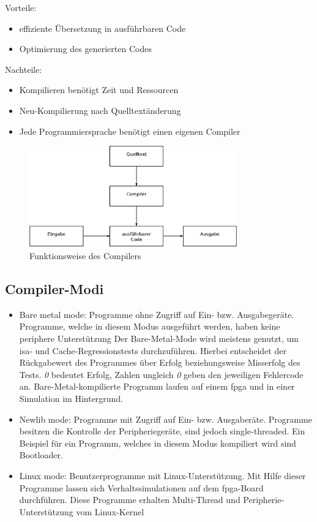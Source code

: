 Vorteile:
\begin{itemize}
  \item effiziente Übersetzung in ausführbaren Code
  \item Optimierung des generierten Codes
\end{itemize}

Nachteile:
\begin{itemize}
  \item Kompilieren benötigt Zeit und Ressourcen
  \item Neu-Kompilierung nach Quelltextänderung
  \item Jede Programmiersprache benötigt einen eigenen Compiler
\end{itemize}

\begin{figure}[H]
\centering
\includegraphics[width=0.8\textwidth]{Hauptteil/Compiler.eps}
\caption{Funktionsweise des Compilers}\label{fig:compiler}
\end{figure}

\subsection{Compiler-Modi}\label{kap:compilermode}
\begin{itemize}
  \item Bare metal mode: Programme ohne Zugriff auf Ein- bzw. Ausgabegeräte. Programme, welche in diesem Modus ausgeführt werden, haben keine periphere Unterstützung
        Der Bare-Metal-Mode wird meistens genutzt, um \ac{isa}- und Cache-Regressionstests durchzuführen. Hierbei entscheidet der Rückgabewert des Programmes über Erfolg beziehungsweise Misserfolg
        des Tests. \emph{0} bedeutet Erfolg, Zahlen ungleich \emph{0} geben den jeweiligen Fehlercode an. Bare-Metal-kompilierte Programm laufen auf einem \ac{fpga} und in einer Simulation
        im Hintergrund.
  \item Newlib mode: Programme mit Zugriff auf Ein- bzw. Ausgaberäte. Programme besitzen die Kontrolle der Peripheriegeräte, sind jedoch single-threaded. Ein Beispiel
  für ein Programm, welches in diesem Modus kompiliert wird sind Bootloader.
  \item Linux mode: Benutzerprogramme mit Linux-Unterstützung. Mit Hilfe dieser Programme lassen sich Verhaltssimulationen auf dem \ac{fpga}-Board durchführen. Diese Programme
  erhalten Multi-Thread und Peripherie-Unterstützung vom Linux-Kernel\cite{lowrisc}\\
\end{itemize}




